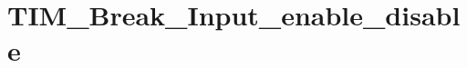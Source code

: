 \hypertarget{group___t_i_m___break___input__enable__disable}{\section{T\-I\-M\-\_\-\-Break\-\_\-\-Input\-\_\-enable\-\_\-disable}
\label{group___t_i_m___break___input__enable__disable}
}
